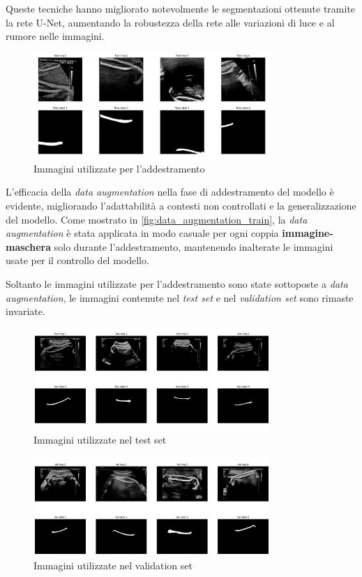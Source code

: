 Queste tecniche hanno migliorato notevolmente le segmentazioni ottenute tramite la rete U-Net,
aumentando la robustezza della rete alle variazioni di luce e al rumore nelle immagini.

\begin{figure}
	\centering
	\includegraphics[width=0.8\textwidth]{Immagini/data_augmentation_train.png}
	\caption{Immagini utilizzate per l'addestramento}
	\label{fig:data_augmentation_train}
\end{figure}

L'efficacia della \textit{data augmentation} nella fase di addestramento del modello è evidente,
migliorando l'adattabilità a contesti non controllati e la generalizzazione del modello. Come
mostrato in \autoref{fig:data_augmentation_train}, la \textit{data augmentation} è stata applicata in modo
casuale per ogni coppia \textbf{immagine-maschera} solo durante l'addestramento, mantenendo
inalterate le immagini usate per il controllo del modello.

Soltanto le immagini utilizzate per l'addestramento sono state sottoposte a \textit{data augmentation},
le immagini contenute nel \textit{test set} e nel \textit{validation set} sono rimaste invariate.


\begin{figure}
	\centering
	\includegraphics[width=0.8\textwidth]{Immagini/data_augmentation_test.png}
	\caption{Immagini utilizzate nel test set}
	\label{fig:data_augmentation_test}
\end{figure}

\begin{figure}
	\centering
	\includegraphics[width=0.8\textwidth]{Immagini/data_augmentation_val.png}
	\caption{Immagini utilizzate nel validation set}
	\label{fig:data_augmentation_val}
\end{figure}

